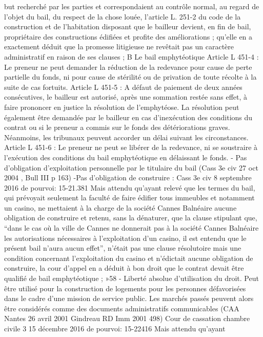 \documentclass[11pt,a4paper]{report}
\begin{document}
	but recherché par les parties et correspondaient au contrôle normal, au regard de l'objet du bail, du respect de
	la chose louée, l'article L. 251-2 du code de la construction et de l'habitation disposant que le bailleur devient,
	en fin de bail, propriétaire des constructions édifiées et profite des améliorations ; qu'elle en a exactement
	déduit que la promesse litigieuse ne revêtait pas un caractère administratif en raison de ses clauses ;
	B Le bail emphytéotique
	Article L 451-4 : Le preneur ne peut demander la réduction de la redevance pour cause de perte partielle du fonds,
	ni pour cause de stérilité ou de privation de toute récolte à la suite de cas fortuits.
	Article L 451-5 : A défaut de paiement de deux années consécutives, le bailleur est autorisé, après une sommation
	restée sans effet, à faire prononcer en justice la résolution de l'emphytéose.
	La résolution peut également être demandée par le bailleur en cas d'inexécution des conditions du contrat ou
	si le preneur a commis sur le fonds des détériorations graves.
	Néanmoins, les tribunaux peuvent accorder un délai suivant les circonstances.
	Article L 451-6 : Le preneur ne peut se libérer de la redevance, ni se soustraire à l'exécution des conditions du bail
	emphytéotique en délaissant le fonds.
	- Pas d’obligation d’exploitation personnelle par le titulaire du bail (Cass 3e civ 27 oct 2004 , Bull III 
	p 163)
	-Pas d’obligation de construire : Cass 3e civ 8 septembre 2016 \No  de pourvoi: 15-21.381 Mais attendu
	qu’ayant relevé que les termes du bail, qui prévoyait seulement la faculté de faire édifier tous immeubles et
	notamment un casino, ne mettaient à la charge de la société Cannes Balnéaire aucune obligation de construire
	et retenu, sans la dénaturer, que la clause stipulant que, “dans le cas où la ville de Cannes ne donnerait pas à la
	société Cannes Balnéaire les autorisations nécessaires à l’exploitation d’un casino, il est entendu que le présent
	bail n’aura aucun effet”, n’était pas une clause résolutoire mais une condition concernant l’exploitation du
	casino et n’édictait aucune obligation de construire, la cour d’appel en a déduit à bon droit que le contrat devait
	être qualifié de bail emphytéotique ; »58
	- Liberté absolue d’utilisation du droit. Peut être utilisé pour la construction de logements pour les personnes
	défavorisées dans le cadre d’une mission de service public. Les marchés passés peuvent alors être considérés
	comme des documents administratifs communicables (CAA Nantes 26 avril 2001 Gindreau RD Imm 2001 498)
	Cour de cassation chambre civile 3 15 décembre 2016 \No  de pourvoi: 15-22416 Mais attendu qu'ayant
\end{document}
